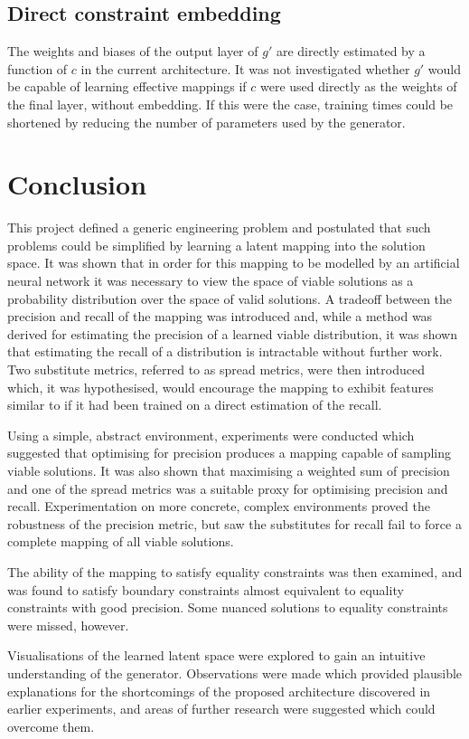 \documentclass[../../main.tex]{subfiles}
\begin{document}
\subsection{Direct constraint embedding} \label{subsection:directConstraintEmbedding}

The weights and biases of the output layer of $g'$ are directly estimated by a function of $c$ in the current architecture.
It was not investigated whether $g'$ would be capable of learning effective mappings if $c$ were used directly as the weights of the final layer, without embedding.
If this were the case, training times could be shortened by reducing the number of parameters used by the generator.

\section{Conclusion} \label{section:conclusion}

This project defined a generic engineering problem and postulated that such problems could be simplified by learning a latent mapping into the solution space.
It was shown that in order for this mapping to be modelled by an artificial neural network it was necessary to view the space of viable solutions as a probability distribution over the space of valid solutions.
A tradeoff between the precision and recall of the mapping was introduced and, while a method was derived for estimating the precision of a learned viable distribution, it was shown that estimating the recall of a distribution is intractable without further work.
Two substitute metrics, referred to as spread metrics, were then introduced which, it was hypothesised, would encourage the mapping to exhibit features similar to if it had been trained on a direct estimation of the recall.

Using a simple, abstract environment, experiments were conducted which suggested that optimising for precision produces a mapping capable of sampling viable solutions.
It was also shown that maximising a weighted sum of precision and one of the spread metrics was a suitable proxy for optimising precision and recall.
Experimentation on more concrete, complex environments proved the robustness of the precision metric, but saw the substitutes for recall fail to force a complete mapping of all viable solutions.

The ability of the mapping to satisfy equality constraints was then examined, and was found to satisfy boundary constraints almost equivalent to equality constraints with good precision.
Some nuanced solutions to equality constraints were missed, however.

Visualisations of the learned latent space were explored to gain an intuitive understanding of the generator.
Observations were made which provided plausible explanations for the shortcomings of the proposed architecture discovered in earlier experiments, and areas of further research were suggested which could overcome them.
\end{document}
